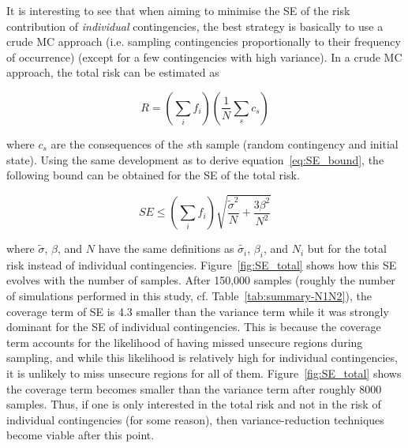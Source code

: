 It is interesting to see that when aiming to minimise the SE of the risk contribution of \emph{individual} contingencies, the best strategy is basically to use a crude MC approach (i.e. sampling contingencies proportionally to their frequency of occurrence) (except for a few contingencies with high variance). In a crude MC approach, the total risk can be estimated as

\begin{equation}
  R = \left(\sum_i f_i\right) \left(\frac{1}{N} \sum_s c_s\right)
\end{equation}

\noindent where \(c_s\) are the consequences of the \(s\)th sample (random contingency and initial state). Using the same development as to derive equation~\ref{eq:SE_bound}, the following bound can be obtained for the SE of the total risk.

\begin{equation}
  \label{eq:SE_total}
  SE \leq \left(\sum_i f_i\right) \sqrt{\frac{\tilde{\sigma}^2}{N} + \frac{3 \beta^2}{N^2}}
\end{equation}

\noindent where \(\tilde{\sigma}\), \(\beta\), and \(N\) have the same definitions as \(\tilde{\sigma_i}\), \(\beta_i\), and \(N_i\) but for the total risk instead of individual contingencies. Figure~\ref{fig:SE_total} shows how this SE evolves with the number of samples. After 150,000 samples (roughly the number of simulations performed in this study, cf. Table~\ref{tab:summary-N1N2}), the coverage term of SE is 4.3 smaller than the variance term while it was strongly dominant for the SE of individual contingencies. This is because the coverage term accounts for the likelihood of having missed unsecure regions during sampling, and while this likelihood is relatively high for individual contingencies, it is unlikely to miss unsecure regions for all of them. Figure~\ref{fig:SE_total} shows the coverage term becomes smaller than the variance term after roughly 8000 samples. Thus, if one is only interested in the total risk and not in the risk of individual contingencies (for some reason), then variance-reduction techniques become viable after this point.

